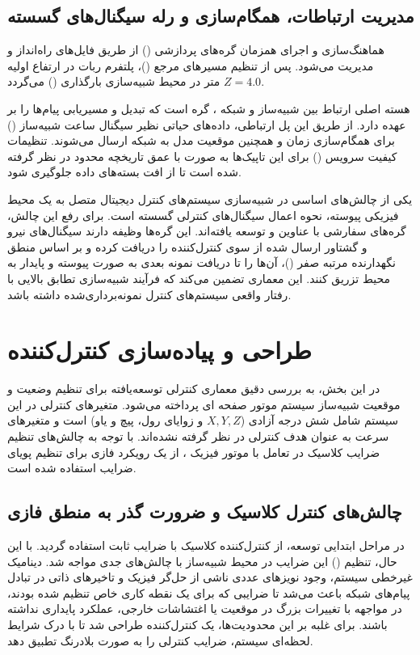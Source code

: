 	\subsection{مدیریت ارتباطات، همگام‌سازی و رله سیگنال‌های گسسته}
	\label{subsec:method-ros-integration}
	هماهنگ‌سازی و اجرای همزمان گره‌های پردازشی () از طریق فایل‌های راه‌انداز 
	 و  مدیریت می‌شود. پس از تنظیم مسیرهای مرجع ()، پلتفرم ربات در ارتفاع اولیه $Z = 4.0$ متر در محیط شبیه‌سازی بارگذاری () می‌گردد.
	
	هسته اصلی ارتباط بین شبیه‌ساز و شبکه ، گره  است که تبدیل و مسیریابی پیام‌ها را بر عهده دارد. از طریق این پل ارتباطی، داده‌های حیاتی نظیر سیگنال ساعت شبیه‌ساز () برای همگام‌سازی زمان و همچنین موقعیت مدل به شبکه ارسال می‌شوند. تنظیمات کیفیت سرویس () برای این تاپیک‌ها به صورت  با عمق تاریخچه محدود در نظر گرفته شده است تا از افت بسته‌های داده جلوگیری شود.
	
	یکی از چالش‌های اساسی در شبیه‌سازی سیستم‌های کنترل دیجیتال متصل به یک محیط فیزیکی پیوسته، نحوه اعمال سیگنال‌های کنترلی گسسته است. برای رفع این چالش، گره‌های سفارشی با عناوین  و  توسعه یافته‌اند. این گره‌ها وظیفه دارند سیگنال‌های نیرو و گشتاور ارسال شده از سوی کنترل‌کننده را دریافت کرده و بر اساس منطق نگهدارنده مرتبه صفر ()، آن‌ها را تا دریافت نمونه بعدی به صورت پیوسته و پایدار به محیط  تزریق کنند. این معماری تضمین می‌کند که فرآیند شبیه‌سازی تطابق بالایی با رفتار واقعی سیستم‌های کنترل نمونه‌برداری‌شده داشته باشد.
	
	\section{طراحی و پیاده‌سازی کنترل‌کننده }
	\label{sec:method-control-design}
	
	در این بخش، به بررسی دقیق معماری کنترلی توسعه‌یافته برای تنظیم وضعیت و موقعیت شبیه‌ساز  سیستم موتور صفحه ای پرداخته می‌شود. متغیرهای کنترلی در این سیستم شامل شش درجه آزادی ($X, Y, Z$ و زوایای رول، پیچ و یاو) است و متغیرهای سرعت به عنوان هدف کنترلی در نظر گرفته نشده‌اند. با توجه به چالش‌های تنظیم ضرایب کلاسیک در تعامل با موتور فیزیک ، از یک رویکرد فازی برای تنظیم پویای ضرایب استفاده شده است.
	
	\subsection{چالش‌های کنترل کلاسیک و ضرورت گذر به منطق فازی}
	\label{subsec:method-classical-challenges}
	در مراحل ابتدایی توسعه، از کنترل‌کننده  کلاسیک با ضرایب ثابت استفاده گردید. با این حال، تنظیم () این ضرایب در محیط شبیه‌ساز با چالش‌های جدی مواجه شد. دینامیک غیرخطی سیستم، وجود نویزهای عددی ناشی از حل‌گر فیزیک  و تاخیرهای ذاتی در تبادل پیام‌های شبکه  باعث می‌شد تا ضرایبی که برای یک نقطه کاری خاص تنظیم شده بودند، در مواجهه با تغییرات بزرگ در موقعیت یا اغتشاشات خارجی، عملکرد پایداری نداشته باشند. برای غلبه بر این محدودیت‌ها، یک کنترل‌کننده  طراحی شد تا با درک شرایط لحظه‌ای سیستم، ضرایب کنترلی را به صورت بلادرنگ تطبیق دهد.
	
